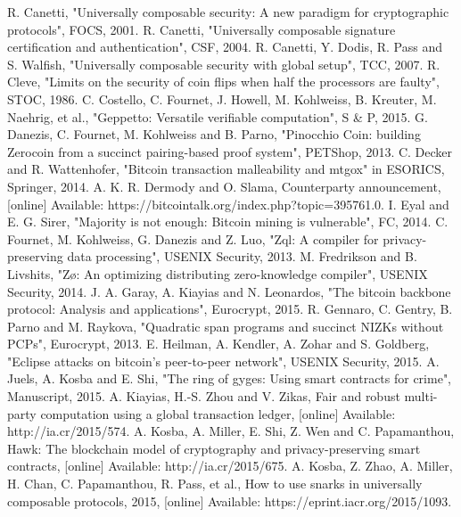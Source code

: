 \documentclass{xduugtrans}
\begin{document}
\begin{thebibliography}{99}
     R. Canetti, "Universally composable security: A new paradigm for cryptographic protocols", FOCS, 2001.
     R. Canetti, "Universally composable signature certification and authentication", CSF, 2004.
     R. Canetti, Y. Dodis, R. Pass and S. Walfish, "Universally composable security with global setup", TCC, 2007.
     R. Cleve, "Limits on the security of coin flips when half the processors are faulty", STOC, 1986.
     C. Costello, C. Fournet, J. Howell, M. Kohlweiss, B. Kreuter, M. Naehrig, et al., "Geppetto: Versatile verifiable computation", S \& P, 2015.
     G. Danezis, C. Fournet, M. Kohlweiss and B. Parno, "Pinocchio Coin: building Zerocoin from a succinct pairing-based proof system", PETShop, 2013.
     C. Decker and R. Wattenhofer, "Bitcoin transaction malleability and mtgox" in ESORICS, Springer, 2014.
     A. K. R. Dermody and O. Slama, Counterparty announcement, [online] Available: https://bitcointalk.org/index.php?topic=395761.0.
     I. Eyal and E. G. Sirer, "Majority is not enough: Bitcoin mining is vulnerable", FC, 2014.
     C. Fournet, M. Kohlweiss, G. Danezis and Z. Luo, "Zql: A compiler for privacy-preserving data processing", USENIX Security, 2013.
     M. Fredrikson and B. Livshits, "Zø: An optimizing distributing zero-knowledge compiler", USENIX Security, 2014.
     J. A. Garay, A. Kiayias and N. Leonardos, "The bitcoin backbone protocol: Analysis and applications", Eurocrypt, 2015.
     R. Gennaro, C. Gentry, B. Parno and M. Raykova, "Quadratic span programs and succinct NIZKs without PCPs", Eurocrypt, 2013.
     E. Heilman, A. Kendler, A. Zohar and S. Goldberg, "Eclipse attacks on bitcoin's peer-to-peer network", USENIX Security, 2015.
     A. Juels, A. Kosba and E. Shi, "The ring of gyges: Using smart contracts for crime", Manuscript, 2015.
     A. Kiayias, H.-S. Zhou and V. Zikas, Fair and robust multi-party computation using a global transaction ledger, [online] Available: http://ia.cr/2015/574.
     A. Kosba, A. Miller, E. Shi, Z. Wen and C. Papamanthou, Hawk: The blockchain model of cryptography and privacy-preserving smart contracts, [online] Available: http://ia.cr/2015/675.
     A. Kosba, Z. Zhao, A. Miller, H. Chan, C. Papamanthou, R. Pass, et al., How to use snarks in universally composable protocols, 2015, [online] Available: https://eprint.iacr.org/2015/1093.

\end{thebibliography}
\end{document}
